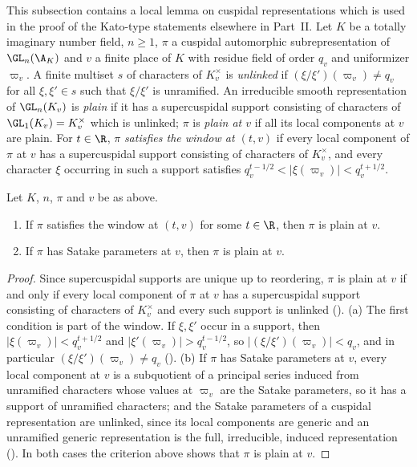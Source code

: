 This subsection contains a local lemma on cuspidal representations which is used in the proof of the Kato-type
statements elsewhere in Part~II. Let $K$ be a totally imaginary number field, $n\ge1$, $\pi$ a cuspidal automorphic
subrepresentation of $\GL_n(\A_K)$ and $v$ a finite place of $K$ with residue field of order $q_v$ and uniformizer
$\varpi_v$. A finite multiset $s$ of characters of $K_v^\times$ is \emph{unlinked} if $(\xi/\xi')(\varpi_v)\ne q_v$ for all
$\xi,\xi'\in s$ such that $\xi/\xi'$ is unramified. An irreducible smooth representation of $\GL_n(K_v)$ is \emph{plain} if it
has a supercuspidal support consisting of characters of $\GL_1(K_v)=K_v^\times$ which is unlinked; $\pi$ is \emph{plain at
$v$} if all its local components at $v$ are plain. For $t\in\R$, $\pi$ \emph{satisfies the window at $(t,v)$} if every local
component of $\pi$ at $v$ has a supercuspidal support consisting of characters of $K_v^\times$, and every character $\xi$
occurring in such a support satisfies $q_v^{t-1/2}<|\xi(\varpi_v)|<q_v^{t+1/2}$.

\begin{lemma}\label{pf:vwin:plainof}
Let $K$, $n$, $\pi$ and $v$ be as above.
\begin{enumerate}[label=(\alph*)]
\item If $\pi$ satisfies the window at $(t,v)$ for some $t\in\R$, then $\pi$ is plain at $v$.
\item If $\pi$ has Satake parameters at $v$, then $\pi$ is plain at $v$.
\end{enumerate}
\end{lemma}

\begin{proof}
Since supercuspidal supports are unique up to reordering, $\pi$ is plain at $v$ if and only if every local component
of $\pi$ at $v$ has a supercuspidal support consisting of characters of $K_v^\times$ and every such support is unlinked
(). (a) The first condition is part of the window.
If $\xi,\xi'$ occur in a support, then $|\xi(\varpi_v)|<q_v^{t+1/2}$ and $|\xi'(\varpi_v)|>q_v^{t-1/2}$, so
$|(\xi/\xi')(\varpi_v)|<q_v$, and in particular $(\xi/\xi')(\varpi_v)\ne q_v$
(). (b) If $\pi$ has Satake parameters at $v$, every local
component at $v$ is a subquotient of a principal series induced from unramified characters whose values at $\varpi_v$ are
the Satake parameters, so it has a support of unramified characters; and the Satake parameters of a cuspidal
representation are unlinked, since its local components are generic and an unramified generic representation is the
full, irreducible, induced representation (). In both
cases the criterion above shows that $\pi$ is plain at $v$.
\end{proof}
